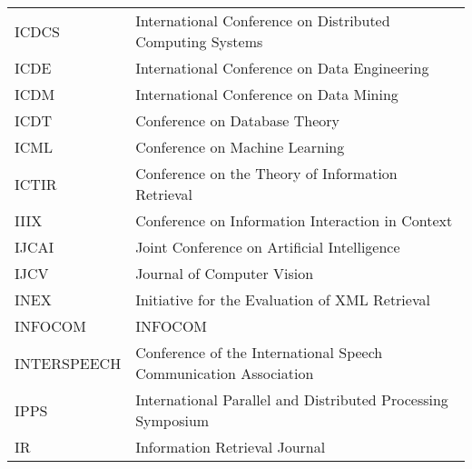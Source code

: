 \begin{table}[h]
\begin{tabular}{ll}
ICDCS					&		International Conference on Distributed Computing Systems  \\ 
ICDE					&		International Conference on Data Engineering  \\ 
ICDM					&		International Conference on Data Mining  \\ 
ICDT					&		Conference on Database Theory  \\ 
ICML					&		Conference on Machine Learning  \\ 
ICTIR					&		Conference on the Theory of Information Retrieval  \\ 
IIIX					&		Conference on Information Interaction in Context  \\ 
IJCAI					&		Joint Conference on Artificial Intelligence  \\ 
IJCV					&		Journal of Computer Vision  \\ 
INEX					&		Initiative for the Evaluation of XML Retrieval  \\ 
INFOCOM					&		INFOCOM  \\ 
INTERSPEECH					&		Conference of the International Speech Communication Association  \\ 
IPPS					&		International Parallel and Distributed Processing Symposium  \\ 
IR					&		Information Retrieval Journal  \\ 
\bottomrule
\end{tabular}
\end{table}

